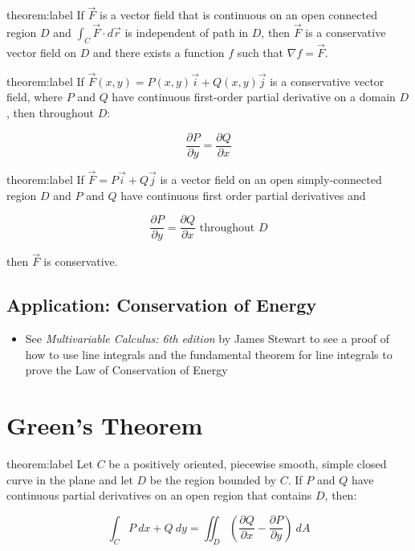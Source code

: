 \documentclass{package/notes}
\begin{document}
\begin{theorem}{theorem:label}
	If $\vec F$ is a vector field that is continuous on an open connected region $D$ and $\int_C \vec F \cdot d\vec r$ is independent of path in $D$, then $\vec F$ is a conservative vector field on $D$ and there exists a function $f$ such that $\nabla f = \vec F$.
\end{theorem}

\begin{theorem}{theorem:label}
	If $\vec F (x,y) = P(x,y)\vec i + Q(x,y) \vec j$ is a conservative vector field, where $P$ and $Q$ have continuous first-order partial derivative on a domain $D$, then throughout $D$:

	$$\frac{\partial P}{\partial y}=\frac{\partial Q}{\partial x}$$
\end{theorem}

\begin{theorem}{theorem:label}
	If $\vec F = P\vec i + Q\vec j$ is a vector field on an open simply-connected region $D$ and $P$ and $Q$ have continuous first order partial derivatives and 

	$$\frac{\partial P}{\partial y} = \frac{\partial Q}{\partial x} \text{    throughout } D$$

	then $\vec F$ is conservative.
\end{theorem}



\subsection{Application: Conservation of Energy}

\begin{itemize}
	\item See \textit{Multivariable Calculus: 6th edition} by James Stewart to see a proof of how to use line integrals and the fundamental theorem for line integrals to prove the Law of Conservation of Energy
\end{itemize}



\section{Green's Theorem}

\begin{theorem}{theorem:label}
	Let $C$ be a positively oriented, piecewise smooth, simple closed curve in the plane and let $D$ be  the region bounded by $C$. If $P$ and $Q$ have continuous partial derivatives on an open region that contains $D$, then:

	$$\int_C P\:dx + Q\:dy = \iint_D\left(\frac{\partial Q}{\partial x}-\frac{\partial P}{\partial y}\right)\:dA$$
\end{theorem}
\end{document}
